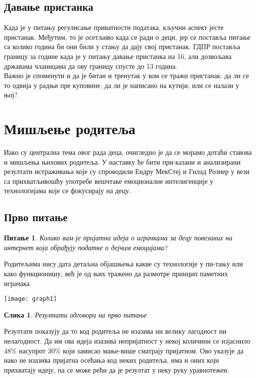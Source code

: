 \documentclass{article}
\newtheorem{question}{Питање}
\newtheorem{image}{Слика}
\begin{document}
\subsection{Давање пристанка}
Када је у питању регулисање приватности података, кључни аспект јесте пристанак. Међутим, то је осетљиво када се ради о деци, јер се поставља питање са колико година би они били у стању да дају свој пристанак. ГДПР поставља границу за године када је у питању давање пристанка на 16, али дозвољава државама чланицама да ову границу спусте до 13 година. \\
Важно је споменути и да је битан и тренутак у ком се тражи пристанак: да ли се то одвија у радњи пре куповине, да ли је написано на кутији, или се налази у њој?

\section{Мишљење родитеља}
Иако су централна тема овог рада деца, очигледно је да се морамо дотаћи ставова и мишљења њихових родитеља. У наставку ће бити при-казани и анализирани резултати истраживања које су спроводили Ендру МекСтеј и Гилад Рознер у вези са прихватљивошћу употребе вешчтаке емоционалне интелигенције у технологијама које се фокусирају на децу. 

\subsection{Прво питање}
\begin{question}
Колико вам је пријатна идеја о играчкама за децу повезаних на интернет која обрађују податке о дејчим емоцијама?
\end{question}

Родитељима нису дата детаљна објашњења какве су технологије у пи-тању или како функционишу, већ је од њих тражено да размотре принцип паметних играчака.

\texttt{[image: graph1]}
\begin{image}
\centering
Резултати одговора на прво питање
\end{image}

Резултати показују да то код родитеља не изазива ни велику лагодност ни нелагодност. Да им ова идеја изазива непријатност у некој количини се изјаснило 48\% насупрот 30\% који замисао мање-више сматрају пријатном. Ово указује да иако не изазива пријатна осећања код неких родитеља, има и оних који прихватају идеју, па се може рећи да је резултат у неку руку уравнотежен.
\end{document}
